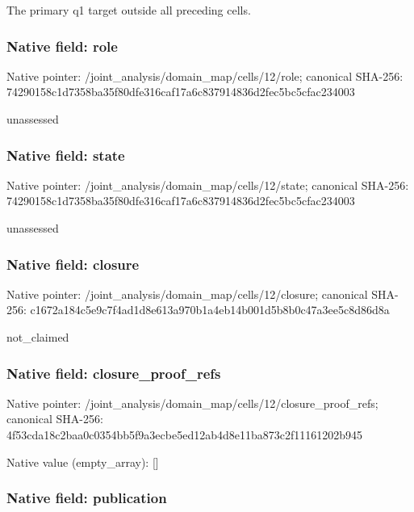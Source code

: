 \documentclass[10pt,a4paper]{article}
\begin{document}
The primary q1 target outside all preceding cells.


\subsubsection{Native field: role}


Native pointer: /joint\_analysis/domain\_m\allowbreak{}ap/cells/12/role; canonical SHA-256: 74290158c1d7358ba35f80df\allowbreak{}e316caf17a6c837914836d2f\allowbreak{}ec5bc5cfac234003


unassessed


\subsubsection{Native field: state}


Native pointer: /joint\_analysis/domain\_m\allowbreak{}ap/cells/12/state; canonical SHA-256: 74290158c1d7358ba35f80df\allowbreak{}e316caf17a6c837914836d2f\allowbreak{}ec5bc5cfac234003


unassessed


\subsubsection{Native field: closure}


Native pointer: /joint\_analysis/domain\_m\allowbreak{}ap/cells/12/closure; canonical SHA-256: c1672a184c5e9c7f4ad1d8e6\allowbreak{}13a970b1a4eb14b001d5b8b0\allowbreak{}c47a3ee5c8d86d8a


not\_claimed


\subsubsection{Native field: closure\_proof\_refs}


Native pointer: /joint\_analysis/domain\_m\allowbreak{}ap/cells/12/closure\_proo\allowbreak{}f\_refs; canonical SHA-256: 4f53cda18c2baa0c0354bb5f\allowbreak{}9a3ecbe5ed12ab4d8e11ba87\allowbreak{}3c2f11161202b945



Native value (empty\_array): []



\subsubsection{Native field: publication}
\end{document}
